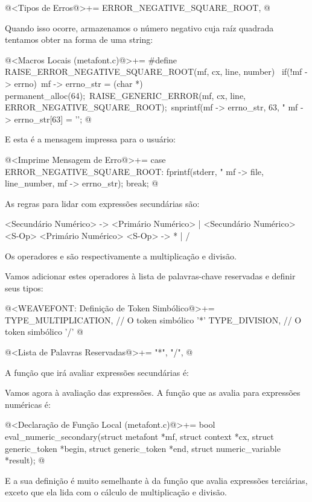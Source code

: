 \iniciocodigo
@<Tipos de Erros@>+=
ERROR_NEGATIVE_SQUARE_ROOT,
@
\fimcodigo

Quando isso ocorre, armazenamos o número negativo cuja raíz quadrada
tentamos obter na forma de uma string:

\iniciocodigo
@<Macros Locais (metafont.c)@>+=
#define RAISE_ERROR_NEGATIVE_SQUARE_ROOT(mf, cx, line, number) {\
  if(!mf -> errno){\
    mf -> errno_str = (char *) permanent_alloc(64);\
    RAISE_GENERIC_ERROR(mf, cx, line, ERROR_NEGATIVE_SQUARE_ROOT);\
    snprintf(mf -> errno_str, 63, "%
    mf -> errno_str[63] = '\0';}}
@
\fimcodigo

E esta é a mensagem impressa para o usuário:

\iniciocodigo
@<Imprime Mensagem de Erro@>+=
case ERROR_NEGATIVE_SQUARE_ROOT:
  fprintf(stderr, "%
          mf -> file, line_number, mf -> errno_str);
  break;
@
\fimcodigo


As regras para lidar com expressões secundárias são:

\alinhaverbatim
<Secundário Numérico> -> <Primário Numérico> |
                         <Secundário Numérico> <S-Op> <Primário Numérico>
<S-Op> -> * | /
\alinhanormal

Os operadores \monoespaco{*} e \monoespaco{/} são respectivamente a
multiplicação e divisão.

Vamos adicionar estes operadores à lista de palavras-chave reservadas
e definir seus tipos:

\iniciocodigo
@<WEAVEFONT: Definição de Token Simbólico@>+=
TYPE_MULTIPLICATION,        // O token simbólico '*'
TYPE_DIVISION,              // O token simbólico '/'
@
\fimcodigo

\iniciocodigo
@<Lista de Palavras Reservadas@>+=
"*", "/",
@
\fimcodigo

A função que irá avaliar expressões secundárias é:

Vamos agora à avaliação das expressões. A função que as avalia para
expressões numéricas é:

\iniciocodigo
@<Declaração de Função Local (metafont.c)@>+=
bool eval_numeric_secondary(struct metafont *mf, struct context *cx,
                            struct generic_token *begin,
                            struct generic_token *end,
                            struct numeric_variable *result);
@
\fimcodigo

E a sua definição é muito semelhante à da função que avalia expressões
terciárias, exceto que ela lida com o cálculo de multiplicação e
divisão.

